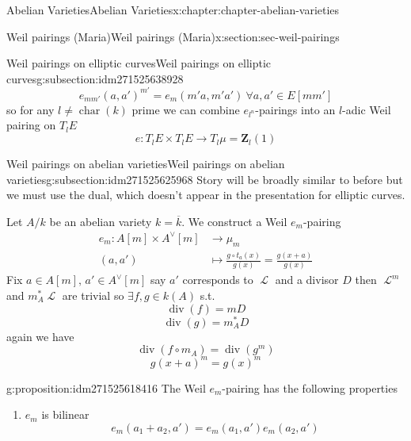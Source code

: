 \documentclass[oneside,10pt,]{book}
\numberwithin{equation}{section}
\newcommand{\sheaf}[1]{\operatorname{\mathcal{#1}}}
\newcommand{\lb}{[}
\newcommand{\rb}{]}
\newcommand{\ZZ}{\mathbf{Z}}
\DeclareMathOperator{\divisor}{div}
\DeclareMathOperator{\characteristic}{char}
\newcommand{\amp}{&}
\begin{document}
\begin{chapterptx}{Abelian Varieties}{}{Abelian Varieties}{}{}{x:chapter:chapter-abelian-varieties}
\begin{sectionptx}{Weil pairings (Maria)}{}{Weil pairings (Maria)}{}{}{x:section:sec-weil-pairings}
\begin{subsectionptx}{Weil pairings on elliptic curves}{}{Weil pairings on elliptic curves}{}{}{g:subsection:idm271525638928}
\begin{equation*}
e_{mm'} (a,a')^{m'} = e_m(m'a, m'a') \ \forall a,a' \in E[mm']
\end{equation*}
so for any \(l\ne \characteristic(k)\) prime we can combine \(e_{l^n}\)-pairings into an \(l\)-adic Weil pairing on \(T_l E\)%
\begin{equation*}
e \colon T_l E\times T_lE \to T_l \mu = \ZZ_l(1)
\end{equation*}
%
\end{subsectionptx}
%
%
\typeout{************************************************}
\typeout{************************************************}
%
\begin{subsectionptx}{Weil pairings on abelian varieties}{}{Weil pairings on abelian varieties}{}{}{g:subsection:idm271525625968}
Story will be broadly similar to before but we must use the dual, which doesn't appear in the presentation for elliptic curves.%
\par
Let \(A/k\) be an abelian variety \(k = \overline k\). We construct a Weil \(e_m\)-pairing%
\begin{align*}
e_m \colon A[m]\times A^\vee [m] \amp\to \mu_m\\
(a,a') \amp\mapsto \frac{g\circ t_a(x)}{g(x)} = \frac{g(x+a)}{g(x)}
\end{align*}
Fix \(a\in A\lb m\rb,\,a'\in A^\vee\lb m\rb\) say \(a'\) corresponds to \(\sheaf L\) and a divisor \(D\) then \(\sheaf L^m \) and \(m_A^* \sheaf L\) are trivial so \(\exists f,g \in k(A)\) s.t.%
\begin{equation*}
\divisor (f) = m D
\end{equation*}
%
\begin{equation*}
\divisor (g) = m_A^* D
\end{equation*}
again we have%
\begin{equation*}
\divisor( f\circ m_A) = \divisor (g^m)
\end{equation*}
%
\begin{equation*}
g(x+a)^m = g(x)^m
\end{equation*}
%
\begin{proposition}{}{}{g:proposition:idm271525618416}%
The Weil \(e_m\)-pairing has the following properties%
\begin{enumerate}
\item{}\(e_m\) is bilinear%
\begin{equation*}
e_m(a_1+a_2,a') = e_m(a_1,a')e_m(a_2, a')
\end{equation*}

\end{enumerate}
\end{proposition}
\end{subsectionptx}
\end{sectionptx}
\end{chapterptx}
\end{document}
